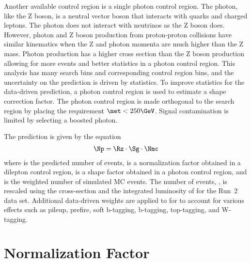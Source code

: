 Another available control region is a single photon control region.
The photon, like the Z boson, is a neutral vector boson that interacts with quarks and charged leptons.
The photon does not interact with neutrinos as the Z boson does.
However, photon and Z boson production from proton-proton collisions have similar kinematics when the Z and photon momenta are much higher than the Z mass.
Photon production has a higher cross section than the Z boson production allowing for more events and better statistics in a photon control region.
This analysis has many search bins and corresponding control region bins, and the uncertainty on the \zinv prediction is driven by statistics.
To improve statistics for the data-driven \zinv prediction, a photon control region is used to estimate a shape correction factor.
The photon control region is made orthogonal to the search region by placing the requirement $\met < 250\GeV$.
Signal contamination is limited by selecting a boosted photon.

The \zinv prediction is given by the equation
\begin{align} %
\label{eq:zinv_pred}
\Np = \Rz \cdot \Sg \cdot \Nmc
\end{align}
where \Np is the predicted number of \zinv events,
\Rz is a normalization factor obtained in a dilepton control region,
\Sg is a shape factor obtained in a photon control region,
and \Nmc is the weighted number of simulated \znunu MC events.
The number of \znunu events, \Nmc, is rescaled using the \znunu cross-section and the integrated luminosity of \datalumi for the Run~2 data set.
Additional data-driven weights are applied to \Nmc for to account for various effects such as pileup, prefire, soft b-tagging, b-tagging, top-tagging, and W-tagging.

\section{Normalization Factor}
\label{sec:zinvisible-normalization}

